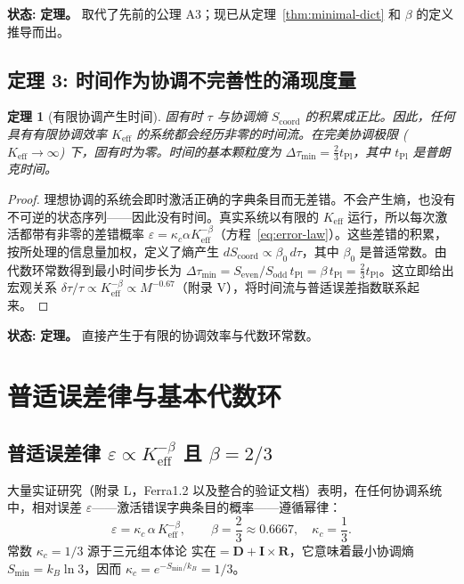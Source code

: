 \documentclass[12pt,a4paper]{article}
\newtheorem{theorem}{定理}[section]
\begin{document}
	\textbf{状态:} \textbf{定理。} 取代了先前的公理 A3；现已从定理~\ref{thm:minimal-dict} 和 \(\beta\) 的定义推导而出。
	
	\subsection{定理 3: 时间作为协调不完善性的涌现度量}
	
	\begin{theorem}[有限协调产生时间]
		\label{thm:time}
		固有时 \(\tau\) 与协调熵 \(S_{\mathrm{coord}}\) 的积累成正比。因此，任何具有有限协调效率 \(K_{\mathrm{eff}}\) 的系统都会经历非零的时间流。在完美协调极限 (\(K_{\mathrm{eff}} \to \infty\)) 下，固有时为零。时间的基本颗粒度为 \(\Delta \tau_{\min} = \frac{2}{3} t_{\mathrm{Pl}}\)，其中 \(t_{\mathrm{Pl}}\) 是普朗克时间。
	\end{theorem}
	
	\begin{proof}
		理想协调的系统会即时激活正确的字典条目而无差错。不会产生熵，也没有不可逆的状态序列——因此没有时间。真实系统以有限的 \(K_{\mathrm{eff}}\) 运行，所以每次激活都带有非零的差错概率 \(\varepsilon = \kappa_c \alpha K_{\mathrm{eff}}^{-\beta}\)（方程~\ref{eq:error-law}）。这些差错的积累，按所处理的信息量加权，定义了熵产生 \(dS_{\mathrm{coord}} \propto \beta_0 \, d\tau\)，其中 \(\beta_0\) 是普适常数。由代数环常数得到最小时间步长为 \(\Delta \tau_{\min} = S_{\mathrm{even}}/S_{\mathrm{odd}} \, t_{\mathrm{Pl}} = \beta \, t_{\mathrm{Pl}} = \frac{2}{3} t_{\mathrm{Pl}}\)。这立即给出宏观关系 \(\delta\tau/\tau \propto K_{\mathrm{eff}}^{-\beta} \propto M^{-0.67}\)（附录 V），将时间流与普适误差指数联系起来。
	\end{proof}
	
	\textbf{状态:} \textbf{定理。} 直接产生于有限的协调效率与代数环常数。
	
	\section{普适误差律与基本代数环}
	\label{sec:error-law}
	
	\subsection{普适误差律 \(\varepsilon \propto K_{\mathrm{eff}}^{-\beta}\) 且 \(\beta = 2/3\)}
	
	大量实证研究（附录 L，Ferra1.2 以及整合的验证文档）表明，在任何协调系统中，相对误差 \(\varepsilon\)——激活错误字典条目的概率——遵循幂律：
	\begin{equation}
		\boxed{\varepsilon = \kappa_c \, \alpha \, K_{\mathrm{eff}}^{-\beta}, \qquad \beta = \frac{2}{3} \approx 0.6667,\quad \kappa_c = \frac{1}{3}}.
		\label{eq:error-law}
	\end{equation}
	常数 \(\kappa_c = 1/3\) 源于三元组本体论 \(\text{实在} = \mathbf{D} + \mathbf{I} \times \mathbf{R}\)，它意味着最小协调熵 \(S_{\min} = k_B \ln 3\)，因而 \(\kappa_c = e^{-S_{\min}/k_B} = 1/3\)。
	
\end{document}
